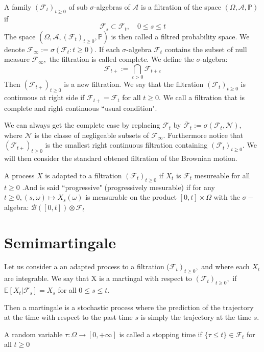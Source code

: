 \begin{definition}

	A family $\left(\mathcal{F}_{t}\right)_{t \geq 0}$  of sub $\sigma$-algebras of $\mathcal{A}$ is a filtration of the space $(\Omega, \mathcal{A}, \mathbb{P})$ if
	\[
	\mathcal{F}_{s} \subset \mathcal{F}_{t}, \quad 0 \leq s \leq t
	\]
	The space $\left(\Omega, \mathcal{A},\left(\mathcal{F}_{t}\right)_{t \geq 0}, \mathbb{P}\right)$ is then called a filtred probability space.
	We denote $\mathcal{F}_{\infty}:=\sigma\left(\mathcal{F}_{t}: t \geq 0\right) .$ If each $\sigma$-algebra $\mathcal{F}_{t}$ contains the subset of null measure $\mathcal{F}_{\infty},$ the filtration is called complete. We define the $\sigma$-algebra:
	\[
	\mathcal{F}_{t+}:=\bigcap_{\varepsilon>0} \mathcal{F}_{t+\varepsilon}
	\]
	Then $\left(\mathcal{F}_{t+}\right)_{t \geq 0}$ is a new filtration. We say that the filtration  $\left(\mathcal{F}_{t}\right)_{t \geq 0}$ is continuous at right side if $\mathcal{F}_{t+}=\mathcal{F}_{t}$ for all $t \geq 0 $. We call a filtration that is complete and right continuous ``usual condition".
\end{definition}
We can always get the complete case by replacing $\mathcal{F}_{t}$ by $\bar{\mathcal{F}}_{t}:=\sigma\left(\mathcal{F}_{t}, \mathcal{N}\right),$ where $\mathcal{N}$ is the classe of negligeable subsets of  $\mathcal{F}_{\infty} .$ Furthermore notice that $\left(\mathcal{F}_{t+}\right)_{t \geq 0}$ is the smallest right continuous filtration containing $\left(\mathcal{F}_{t}\right)_{t \geq 0} .$
We will then consider the standard obtened filtration of the Brownian motion.
\begin{definition}
	A process $X$ is adapted to a filtration $\left(\mathcal{F}_{t}\right)_{t \geq 0}$ if $X_{t}$ is $\mathcal{F}_{t}$ mesureable for all $t \geq 0$ .And is said ``progressive" (progressively mesurable) if for any $t \geq 0,(s, \omega) \mapsto X_{s}(\omega)$ is measurable on the product $[0, t] \times \Omega$ with the $\sigma-$algebra: $\mathcal{B}([0, t]) \otimes \mathcal{F}_{t}$
\end{definition}

\section{Semimartingale}
\begin{definition}
	Let us consider a an adapted process to a filtration ($\left.\mathcal{F}_{t}\right)_{t \geq 0},$ and where each $X_t$ are integrable.
	We say that X is a martingal with respect to $\left(\mathcal{F}_{t}\right)_{t \geq 0},$ if  $\mathbb{E}[X_{t} | \mathcal{F}_{s}]=X_{s}$ for all $0 \leq s \leq t$.

	Then a martingale is a stochastic process where the prediction of the trajectory at the time  with respect to the past time $ s $ is simply the trajectory at the time $ s $.
\end{definition}
	\begin{definition}
		A random variable $\tau: \Omega \rightarrow[0,+\infty]$ is called a stopping time if $\{\tau \leq t\} \in \mathcal{F}_{t}$ for all $t \geq 0$
	\end{definition}

